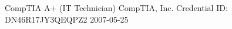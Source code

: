 \awarditem
    {CompTIA A+ (IT Technician)}
    {CompTIA, Inc.}
    {Credential ID: DN46R17JY3QEQPZ2}
    {2007-05-25}
